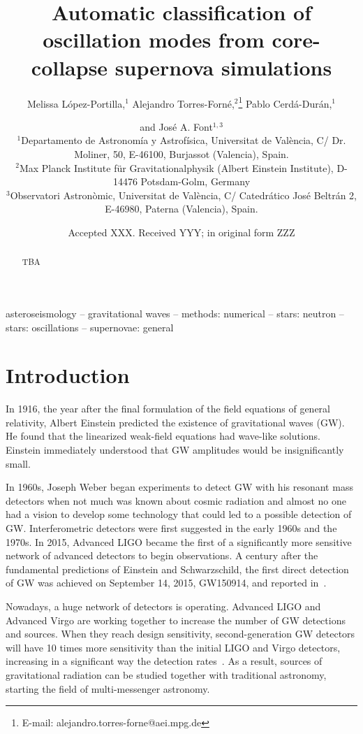 \documentclass[fleqn,usenatbib]{mnras}
\title[Automatic classification of oscillation modes]{Automatic classification of oscillation modes from core-collapse supernova simulations}
\author[M.~L\'opez-Portilla, A.~Torres-Forn\'e, P.~Cerd\'a-Dur\'an and J.A.~Font]{
Melissa L\'opez-Portilla,$^1$
Alejandro Torres-Forn\'e,$^{2}$\thanks{E-mail: alejandro.torres-forne@aei.mpg.de}
Pablo Cerd\'a-Dur\'an,$^{1}$ 
\and and Jos\'e A. Font$^{1,3}$
\\
$^{1}$Departamento de Astronom\'ia y Astrof\'isica, Universitat de Val\`encia, C/ Dr. Moliner, 50, E-46100, Burjassot (Valencia), Spain. \\
$^{2}$Max Planck Institute f\"{u}r Gravitationalphysik (Albert Einstein Institute), D-14476 Potsdam-Golm, Germany \\
$^{3}$Observatori Astron\`omic, Universitat de Val\`encia, C/ Catedr\'atico Jos\'e Beltr\'an 2, E-46980, Paterna (Valencia), Spain.
}
\date{Accepted XXX. Received YYY; in original form ZZZ}
\begin{document}
\label{firstpage}
\pagerange{\pageref{firstpage}--\pageref{lastpage}}
\maketitle

\begin{abstract}
TBA
\end{abstract}

\begin{keywords}
asteroseismology -- gravitational waves -- methods: numerical -- stars: neutron -- stars: oscillations -- supernovae: general
\end{keywords}


\newcommand{\runi}{{\hat {\boldsymbol r}}}
\newcommand{\thetauni}{{\hat {\boldsymbol \theta}}}
\newcommand{\varphiuni}{{\hat {\boldsymbol \varphi}}}


\section{Introduction}



In 1916, the year after the final formulation of the field equations of general relativity, Albert Einstein predicted the existence of gravitational waves (GW). He found that the linearized weak-field equations had wave-like solutions. Einstein immediately understood that GW amplitudes would be insignificantly small. 

In 1960s, Joseph Weber began experiments to detect GW with  his resonant mass detectors when not much was known about cosmic radiation and almost no one had a vision to develop some technology that could led to a possible detection of GW. 
Interferometric detectors were first suggested in the early 1960s and the 1970s. In 2015, Advanced LIGO became the first of a significantly more sensitive network of advanced detectors to begin observations. A century after the fundamental predictions of Einstein and Schwarzschild, the first direct detection of GW was achieved on September 14, 2015, GW150914, and reported in~\cite{}.

Nowadays, a huge network of detectors is operating. Advanced LIGO and Advanced Virgo are working together to increase the number of GW detections and sources. When they reach design sensitivity, second-generation GW detectors will have 10 times more sensitivity than the initial LIGO and Virgo detectors, increasing in a significant way the detection rates~\cite{}. As a result, sources of gravitational radiation can be studied together with traditional astronomy, starting the field of multi-messenger astronomy.
\end{document}
